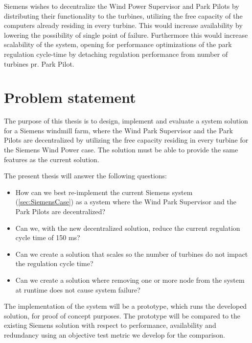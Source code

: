 Siemens wishes to decentralize the Wind Power Supervisor and Park Pilots by distributing their functionality to the turbines, utilizing the free capacity of the computers already residing in every turbine. This would increase availability by lowering the possibility of single point of failure. Furthermore this would increase scalability of the system, opening for performance optimizations of the park regulation cycle-time by detaching regulation performance from number of turbines pr. Park Pilot. 


\section{Problem statement}

The purpose of this thesis is to design, implement and evaluate a system solution for a Siemens windmill farm, where the Wind Park Supervisor and the Park Pilots are decentralized by utilizing the free capacity residing in every turbine for the Siemens Wind Power case. The solution must be able to provide the same features as the current solution. 

The present thesis will answer the following questions: 

\begin{itemize} 
	\item How can we best re-implement the current Siemens system (\cref{sec:SiemensCase}) as a system where the Wind Park Supervisor and the Park Pilots are decentralized?
	\item Can we, with the new decentralized solution, reduce the current regulation cycle time of 150 ms?
	\item Can we create a solution that scales so the number of turbines do not impact the regulation cycle time?
	\item Can we create a solution where removing one or more node from the system at runtime does not cause system failure?
\end{itemize}

The implementation of the system will be a prototype, which runs the developed solution, for proof of concept purposes. The prototype will be compared to the existing Siemens solution with respect to performance, availability and redundancy using an objective test metric we develop for the comparison.



